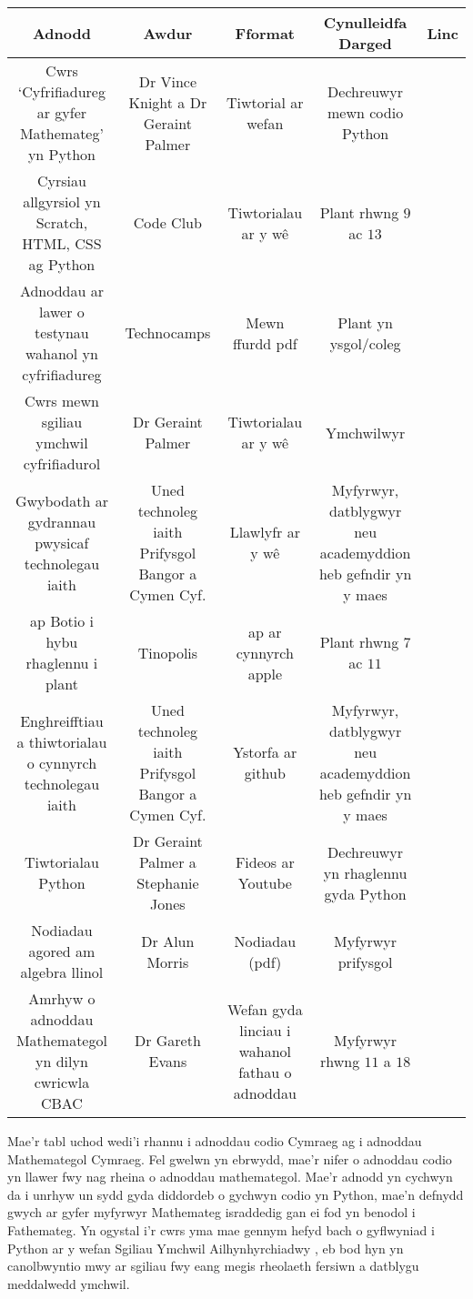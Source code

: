 \begin{center}
\begin{tabular}{ | c | c | c | c | c | }
\hline
Adnodd & Awdur & Fformat & Cynulleidfa Darged & Linc\\
\hline
Cwrs `Cyfrifiadureg ar gyfer Mathemateg' yn Python & Dr Vince Knight a Dr Geraint Palmer & Tiwtorial ar wefan & Dechreuwyr mewn codio Python & \cite{Cyfrifiadureg-maths}\\
\hline
Cyrsiau allgyrsiol yn Scratch, HTML, CSS ag Python & Code Club & Tiwtorialau ar y w\^{e} & Plant rhwng $9$ ac $13$ & \cite{codeclub} \\
\hline
Adnoddau ar lawer o testynau wahanol yn cyfrifiadureg & Technocamps & Mewn ffurdd pdf & Plant yn ysgol/coleg & \cite{technocamps} \\
\hline
Cwrs mewn sgiliau ymchwil cyfrifiadurol & Dr Geraint Palmer & Tiwtorialau ar y w\^{e} & Ymchwilwyr & \cite{python-sgiliauymchwil} \\
\hline
Gwybodath ar gydrannau pwysicaf technolegau iaith & Uned technoleg iaith Prifysgol Bangor a Cymen Cyf. & Llawlyfr ar y w\^{e}  & Myfyrwyr, datblygwyr neu academyddion heb gefndir yn y maes & \cite{technolegau-iaith} \\
\hline
ap Botio i hybu rhaglennu i plant & Tinopolis & ap ar cynnyrch apple & Plant rhwng $7$ ac $11$ & \cite{botio} \\
\hline
Enghreifftiau a thiwtorialau o cynnyrch technolegau iaith  &  Uned technoleg iaith Prifysgol Bangor a Cymen Cyf. & Ystorfa ar github & Myfyrwyr, datblygwyr neu academyddion heb gefndir yn y maes & \cite{github-technolegauiaith} \\
\hline
Tiwtorialau Python & Dr Geraint Palmer a Stephanie Jones & Fideos ar Youtube & Dechreuwyr yn rhaglennu gyda Python & \cite{youtube} \\
\hline
\hline
Nodiadau agored am algebra llinol & Dr Alun Morris & Nodiadau (pdf) & Myfyrwyr prifysgol & \cite{Algebra-llinol}\\
\hline
Amrhyw o adnoddau Mathemategol yn dilyn cwricwla CBAC & Dr Gareth Evans & Wefan gyda linciau i wahanol fathau o adnoddau & Myfyrwyr rhwng $11$ a $18$ & \cite{mathemateg} \\
\hline
\end{tabular}
\end{center}

Mae'r tabl uchod wedi'i rhannu i adnoddau codio Cymraeg ag i adnoddau Mathemategol Cymraeg. Fel gwelwn yn ebrwydd, mae'r nifer o adnoddau codio yn llawer fwy nag rheina o adnoddau mathemategol. Mae'r adnodd \cite{Cyfrifiadureg-maths} yn cychwyn da i unrhyw un sydd gyda diddordeb o gychwyn codio yn Python, mae'n defnydd gwych ar gyfer myfyrwyr Mathemateg israddedig gan ei fod yn benodol i Fathemateg. Yn ogystal i'r cwrs yma mae gennym hefyd bach o gyflwyniad i Python ar y wefan Sgiliau Ymchwil Ailhynhyrchiadwy \cite{python-sgiliauymchwil}, eb bod hyn yn canolbwyntio mwy ar sgiliau fwy eang megis rheolaeth fersiwn a datblygu meddalwedd ymchwil.

